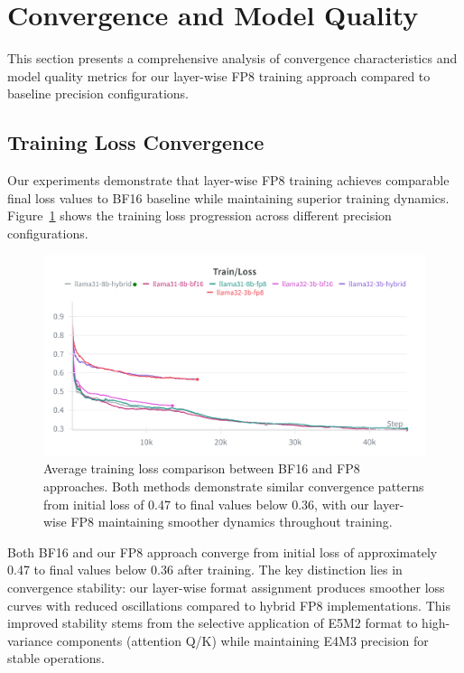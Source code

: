 \section{Convergence and Model Quality}\label{sec:evaluation}

This section presents a comprehensive analysis of convergence characteristics and model quality metrics for our layer-wise FP8 training approach compared to baseline precision configurations.

\subsection{Training Loss Convergence}

Our experiments demonstrate that layer-wise FP8 training achieves comparable final loss values to BF16 baseline while maintaining superior training dynamics. Figure~\ref{fig:training_loss} shows the training loss progression across different precision configurations.

\begin{figure}[h]
    \centering
    \includegraphics[width=0.9\linewidth]{figures/c4/avg_loss.png}
    \caption{Average training loss comparison between BF16 and FP8 approaches. Both methods demonstrate similar convergence patterns from initial loss of 0.47 to final values below 0.36, with our layer-wise FP8 maintaining smoother dynamics throughout training.}
    \label{fig:training_loss}
\end{figure}

Both BF16 and our FP8 approach converge from initial loss of approximately 0.47 to final values below 0.36 after training. The key distinction lies in convergence stability: our layer-wise format assignment produces smoother loss curves with reduced oscillations compared to hybrid FP8 implementations. This improved stability stems from the selective application of E5M2 format to high-variance components (attention Q/K) while maintaining E4M3 precision for stable operations.

